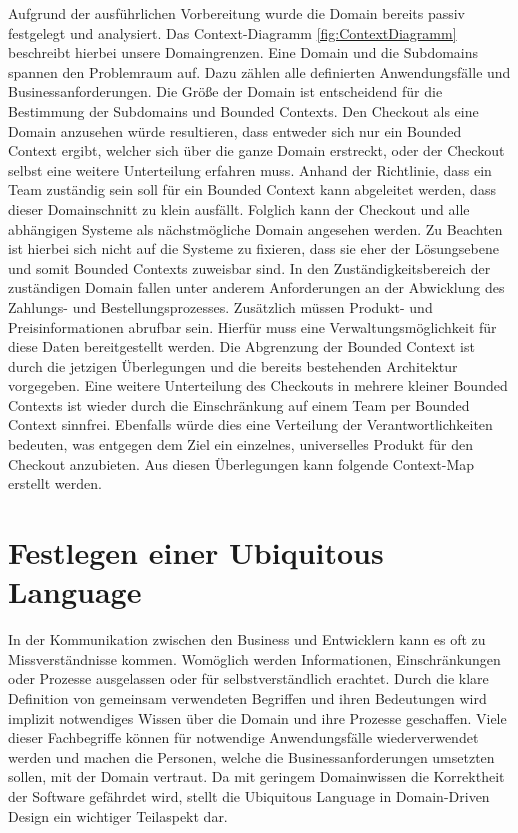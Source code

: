Aufgrund der ausführlichen Vorbereitung wurde die Domain bereits passiv festgelegt und analysiert. Das Context-Diagramm \ref{fig:ContextDiagramm} beschreibt hierbei unsere Domaingrenzen. Eine Domain und die Subdomains spannen den Problemraum auf. Dazu zählen alle definierten Anwendungsfälle und Businessanforderungen. Die Größe der Domain ist entscheidend für die Bestimmung der Subdomains und Bounded Contexts. Den Checkout als eine Domain anzusehen würde resultieren, dass entweder sich nur ein Bounded Context ergibt, welcher sich über die ganze Domain erstreckt, oder der Checkout selbst eine weitere Unterteilung erfahren muss. Anhand der Richtlinie, dass ein Team zuständig sein soll für ein Bounded Context kann abgeleitet werden, dass dieser Domainschnitt zu klein ausfällt. Folglich kann der Checkout und alle abhängigen Systeme als nächstmögliche Domain angesehen werden. Zu Beachten ist hierbei sich nicht auf die Systeme zu fixieren, dass sie eher der Lösungsebene und somit Bounded Contexts zuweisbar sind. In den Zuständigkeitsbereich der zuständigen Domain fallen unter anderem Anforderungen an der Abwicklung des Zahlungs- und Bestellungsprozesses. Zusätzlich müssen Produkt- und Preisinformationen abrufbar sein. Hierfür muss eine Verwaltungsmöglichkeit für diese Daten bereitgestellt werden. Die Abgrenzung der Bounded Context ist durch die jetzigen Überlegungen und die bereits bestehenden Architektur vorgegeben. Eine weitere Unterteilung des Checkouts in mehrere kleiner Bounded Contexts ist wieder durch die Einschränkung auf einem Team per Bounded Context sinnfrei. Ebenfalls würde dies eine Verteilung der Verantwortlichkeiten bedeuten, was entgegen dem Ziel ein einzelnes, universelles Produkt für den Checkout anzubieten. Aus diesen Überlegungen kann folgende Context-Map erstellt werden. %

\section{Festlegen einer Ubiquitous Language}

In der Kommunikation zwischen den Business und Entwicklern kann es oft zu Missverständnisse kommen. Womöglich werden Informationen, Einschränkungen oder Prozesse ausgelassen oder für selbstverständlich erachtet. Durch die klare Definition von gemeinsam verwendeten Begriffen und ihren Bedeutungen wird implizit notwendiges Wissen über die Domain und ihre Prozesse geschaffen. Viele dieser Fachbegriffe können für notwendige Anwendungsfälle wiederverwendet werden und machen die Personen, welche die Businessanforderungen umsetzten sollen, mit der Domain vertraut. Da mit geringem Domainwissen die Korrektheit der Software gefährdet wird, stellt die Ubiquitous Language in Domain-Driven Design ein wichtiger Teilaspekt dar.

